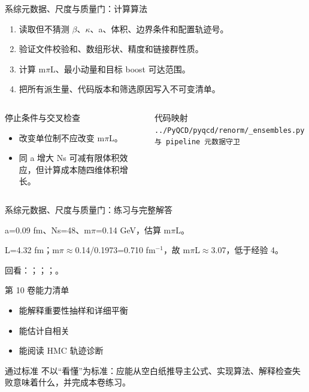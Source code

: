 \begin{frame}[t]{系综元数据、尺度与质量门：计算算法}
\footnotesize
{}\begin{enumerate}
\item 读取但不猜测 \ensuremath{\beta}、\ensuremath{\kappa}、a、体积、边界条件和配置轨迹号。
\item 验证文件校验和、数组形状、精度和链接群性质。
\item 计算 m\ensuremath{\pi}L、最小动量和目标 boost 可达范围。
\item 把所有派生量、代码版本和筛选原因写入不可变清单。
\end{enumerate}\begin{columns}[T,onlytextwidth]
\begin{block}{停止条件与交叉检查}\scriptsize\begin{itemize}
\item[\CheckMark] 改变单位制不应改变 m\ensuremath{\pi}L。
\item[\CheckMark] 同 a 增大 Ns 可减有限体积效应，但计算成本随四维体积增长。
\end{itemize}\end{block}
\begin{block}{代码映射}
\scriptsize \texttt{.\allowbreak{}.\allowbreak{}/\allowbreak{}PyQCD/\allowbreak{}pyqcd/\allowbreak{}renorm/\allowbreak{}\_\allowbreak{}ensembles.\allowbreak{}py 与 pipeline 元数据守卫}
\end{block}\end{columns}\end{frame}

\begin{frame}[t]{系综元数据、尺度与质量门：练习与完整解答}
\footnotesize
\begin{block}{}a=0.09 fm、Ns=48、m\ensuremath{\pi}=0.14 GeV，估算 m\ensuremath{\pi}L。\end{block}
\begin{exampleblock}{}L=4.32 fm；m\ensuremath{\pi}\ensuremath{\approx}0.14/\allowbreak{}0.1973=0.710 fm\ensuremath{^{-1}}，故 m\ensuremath{\pi}L\ensuremath{\approx}3.07，低于经验 4。\end{exampleblock}
\vfill
\scriptsize 回看：；；；。
\end{frame}

\begin{frame}[t]{第 10 卷能力清单}
\small\begin{itemize}
\item[\CheckMark] 能解释重要性抽样和详细平衡
\item[\CheckMark] 能估计自相关
\item[\CheckMark] 能阅读 HMC 轨迹诊断
\end{itemize}\vfill\begin{block}{通过标准}
不以“看懂”为标准：应能从空白纸推导主公式、实现算法、解释检查失败意味着什么，并完成本卷练习。
\end{block}\end{frame}

